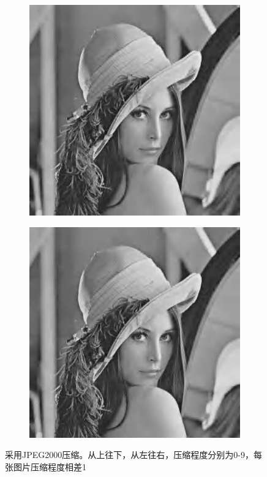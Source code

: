 \documentclass{article}
\begin{document}
\begin{figure}[htbp]
\begin{subfigure}{.19\textwidth}
    \end{subfigure}
    \begin{subfigure}{.19\textwidth}
        \includegraphics[width=\linewidth]{img/jpeg2000/80.jpg}
    \end{subfigure}
    \begin{subfigure}{.19\textwidth}
        \includegraphics[width=\linewidth]{img/jpeg2000/90.jpg}
    \end{subfigure}
    \caption{采用JPEG2000压缩。从上往下，从左往右，压缩程度分别为0-9，每张图片压缩程度相差1}
    \label{jpeg2000}
\end{figure}
\end{document}
